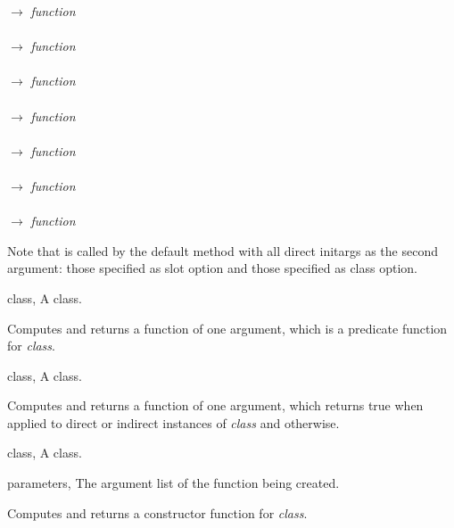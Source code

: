 \begin{optDefinition}
\begin{table}
\begin{tabbing}
    \>\>\>\>
    $\rightarrow$ {\em function}\\
    \\
    \>\>\>\>
    $\rightarrow$ {\em function}\\
    \>\\
    \>\>\>\>\>
    $\rightarrow$ {\em function}\\
    \>\>\\
    \>\>\>\>\>\>
    $\rightarrow$ {\em function}\\
    \\
    \>\>\>\>
    $\rightarrow$ {\em function}\\
    \>\\
    \>\>\>\>\>
    $\rightarrow$ {\em function}\\
    \>\>\\
    \>\>\>\>\>\>
    $\rightarrow$ {\em function}%
\end{tabbing}%
\end{table}%
%
Note that  is called by the default
 method with all direct initargs as the second argument:
those specified as slot option and those specified as class option.

%
\begin{genericargs}
    \item[class, \classref{class}] A class.
\end{genericargs}
%
\result%
Computes and returns a function of one argument, which is a predicate
function for {\em class}.

%
\begin{specargs}
    \item[class, \classref{class}] A class.
\end{specargs}
%
\result%
Computes and returns a function of one argument, which returns true when applied
to direct or indirect instances of {\em class} and \nil\/ otherwise.

%
\begin{genericargs}
    \item[class, \classref{class}] A class.
    \item[parameters, \classref{list}] The argument list of the function being
    created.
\end{genericargs}
%
\result%
Computes and returns a constructor function for {\em class}.


\end{optDefinition}
